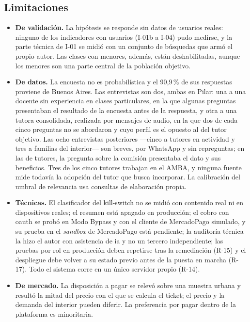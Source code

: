 \subsection{Limitaciones}\label{sec:limitaciones-finales}

\begin{itemize}
    \item \textbf{De validación.} La hipótesis se responde sin datos de
          usuarios reales: ninguno de los indicadores con usuarios (I-01b
          a I-04) pudo medirse, y la parte técnica de I-01 se midió con un
          conjunto de búsquedas que armó el propio autor. Las clases con
          menores, además, están deshabilitadas, aunque los menores son
          una parte central de la población objetivo.
    \item \textbf{De datos.} La encuesta no es probabilística y el
          90,9\,\% de sus respuestas proviene de Buenos Aires. Las
          entrevistas son dos, ambas en Pilar: una a una docente sin
          experiencia en clases particulares, en la que algunas preguntas
          presentaban el resultado de la encuesta antes de la respuesta, y
          otra a una tutora consolidada, realizada por mensajes de audio,
          en la que dos de cada cinco preguntas no se abordaron y cuyo
          perfil es el opuesto al del tutor objetivo. Las ocho entrevistas
          posteriores ---cinco a tutores en actividad y tres a familias
          del interior--- son breves, por WhatsApp y sin repreguntas;
          en las de tutores, la pregunta sobre la comisión presentaba el
          dato y sus beneficios. Tres de los cinco tutores trabajan en el
          AMBA, y ninguna fuente mide todavía la adopción del
          tutor que \sistema{} busca incorporar.
          La calibración del umbral de relevancia usa consultas de
          elaboración propia.
    \item \textbf{Técnicas.} El clasificador del kill-switch no se midió
          con contenido real ni en dispositivos reales; el resumen está
          apagado en producción; el cobro con \gls{oauth} se probó en
          Modo Bypass y con el cliente de MercadoPago simulado, y su
          prueba en el \emph{sandbox} de MercadoPago está pendiente; la
          auditoría técnica la hizo el autor con asistencia de \gls{ia} y
          no un tercero independiente; las pruebas por rol en
          producción deben repetirse tras la remediación (R-15) y el
          despliegue debe volver a su estado previo antes de la puesta en
          marcha (R-17). Todo el sistema corre en un único servidor propio
          (R-14).
    \item \textbf{De mercado.} La disposición a pagar se relevó sobre una
          muestra urbana y resultó la mitad del precio con el que se
          calcula el ticket; el precio y la demanda del interior pueden
          diferir. La preferencia por pagar dentro de la plataforma es
          minoritaria.
\end{itemize}

